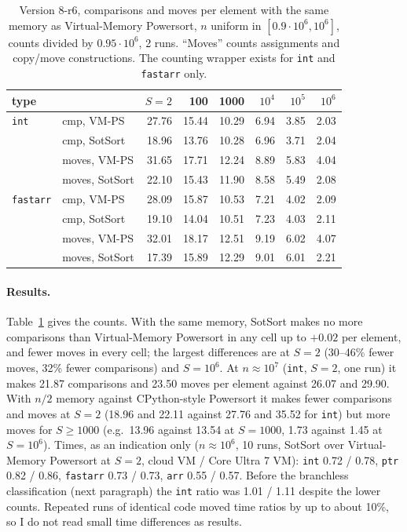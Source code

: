 \documentclass[10pt,a4paper]{article}
\begin{document}
\begin{table}[t]\centering\small
\begin{tabular}{@{}llrrrrrr@{}}\toprule
type & & $S=2$ & 100 & 1000 & $10^4$ & $10^5$ & $10^6$\\\midrule
\texttt{int} & cmp, VM-PS & 27.76 & 15.44 & 10.29 & 6.94 & 3.85 & 2.03\\
 & cmp, SotSort & 18.96 & 13.76 & 10.28 & 6.96 & 3.71 & 2.04\\
 & moves, VM-PS & 31.65 & 17.71 & 12.24 & 8.89 & 5.83 & 4.04\\
 & moves, SotSort & 22.10 & 15.43 & 11.90 & 8.58 & 5.49 & 2.08\\\midrule
\texttt{fastarr} & cmp, VM-PS & 28.09 & 15.87 & 10.53 & 7.21 & 4.02 & 2.09\\
 & cmp, SotSort & 19.10 & 14.04 & 10.51 & 7.23 & 4.03 & 2.11\\
 & moves, VM-PS & 32.01 & 18.17 & 12.51 & 9.19 & 6.02 & 4.07\\
 & moves, SotSort & 17.39 & 15.89 & 12.29 & 9.01 & 6.01 & 2.21\\\bottomrule
\end{tabular}
\caption{Version 8-r6, comparisons and moves per element with the same memory as
Virtual-Memory Powersort, $n$ uniform in $[0.9\cdot10^6, 10^6]$, counts divided by $0.95\cdot10^6$,
2 runs. ``Moves'' counts assignments and copy/move constructions. The counting wrapper exists
for \texttt{int} and \texttt{fastarr} only.}\label{tab:vmcount}
\end{table}

\paragraph{Results.} Table~\ref{tab:vmcount} gives the counts. With the same memory, SotSort makes
no more comparisons than Virtual-Memory Powersort in any cell up to $+0.02$ per element, and
fewer moves in every cell; the largest differences are at $S=2$ (30--46\% fewer moves, 32\% fewer
comparisons) and $S=10^6$. At $n\approx10^7$ (\texttt{int}, $S=2$, one run) it makes 21.87
comparisons and 23.50 moves per element against 26.07 and 29.90. With $n/2$ memory against
CPython-style Powersort it makes fewer comparisons and moves at $S=2$ (18.96 and 22.11 against
27.76 and 35.52 for \texttt{int}) but more moves for $S\ge1000$ (e.g.\ 13.96 against 13.54 at
$S=1000$, 1.73 against 1.45 at $S=10^6$). Times, as an indication only ($n\approx10^6$, 10 runs, SotSort over Virtual-Memory Powersort
at $S=2$, cloud VM / Core Ultra 7 VM): \texttt{int} 0.72 / 0.78, \texttt{ptr} 0.82 / 0.86,
\texttt{fastarr} 0.73 / 0.73, \texttt{arr} 0.55 / 0.57. Before the branchless classification
(next paragraph) the \texttt{int} ratio was 1.01 / 1.11 despite the lower counts. Repeated runs
of identical code moved time ratios by up to about 10\%, so I do not read small time differences
as results.
\end{document}
